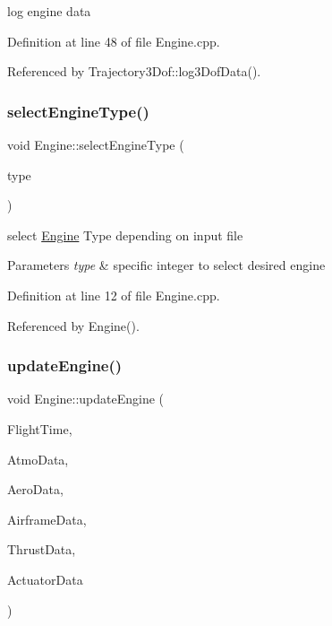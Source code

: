log engine data 



Definition at line 48 of file Engine.\+cpp.



Referenced by Trajectory3\+Dof\+::log3\+Dof\+Data().

\mbox{\label{class_engine_ac33371d6fff86c0c8e14495f10046d9a}} 
\subsubsection{\texorpdfstring{select\+Engine\+Type()}{selectEngineType()}}
{\footnotesize\ttfamily void Engine\+::select\+Engine\+Type (\begin{DoxyParamCaption}\item[{int}]{type }\end{DoxyParamCaption})}



select \hyperlink{class_engine}{Engine} Type depending on input file 


\begin{DoxyParams}{Parameters}
{\em type} & specific integer to select desired engine \\
\hline
\end{DoxyParams}


Definition at line 12 of file Engine.\+cpp.



Referenced by Engine().

\mbox{\label{class_engine_a187c605d94ef94c34c046619ca5e0991}} 
\subsubsection{\texorpdfstring{update\+Engine()}{updateEngine()}}
{\footnotesize\ttfamily void Engine\+::update\+Engine (\begin{DoxyParamCaption}\item[{\hyperlink{group___tools_ga3f1431cb9f76da10f59246d1d743dc2c}{Float64}}]{Flight\+Time,  }\item[{Atmosphere\+Struct \&}]{Atmo\+Data,  }\item[{Aerodynamic\+Struct \&}]{Aero\+Data,  }\item[{Airframe\+Struct \&}]{Airframe\+Data,  }\item[{Thrust\+Struct \&}]{Thrust\+Data,  }\item[{Actuator\+Struct \&}]{Actuator\+Data }\end{DoxyParamCaption})}

